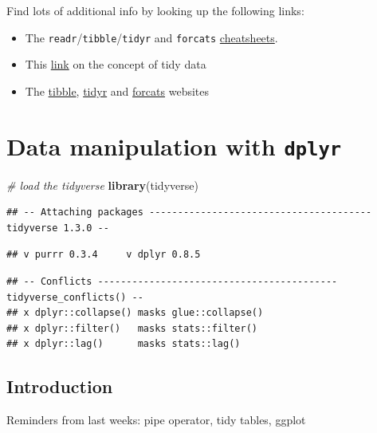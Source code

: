 \documentclass[]{book}
\newenvironment{Shaded}{}{}
\newcommand{\CommentTok}[1]{\textcolor[rgb]{0.38,0.63,0.69}{\textit{#1}}}
\newcommand{\KeywordTok}[1]{\textcolor[rgb]{0.00,0.44,0.13}{\textbf{#1}}}
\newcommand{\NormalTok}[1]{#1}
\providecommand{\tightlist}{%
  \setlength{\itemsep}{0pt}\setlength{\parskip}{0pt}}
\begin{document}
Find lots of additional info by looking up the following links:

\begin{itemize}
\tightlist
\item
  The \texttt{readr}/\texttt{tibble}/\texttt{tidyr} and \texttt{forcats} \href{https://rstudio.com/resources/cheatsheets/}{cheatsheets}.
\item
  This \href{https://tidyr.tidyverse.org/articles/tidy-data.html}{link} on the concept of tidy data
\item
  The \href{https://tibble.tidyverse.org/}{tibble}, \href{https://tidyr.tidyverse.org/}{tidyr} and \href{https://forcats.tidyverse.org/}{forcats} websites
\end{itemize}

\hypertarget{data-manipulation-with-dplyr}{%
\chapter{\texorpdfstring{Data manipulation with \texttt{dplyr}}{Data manipulation with dplyr}}\label{data-manipulation-with-dplyr}}

\begin{Shaded}
\begin{Highlighting}[]
\CommentTok{# load the tidyverse}
\KeywordTok{library}\NormalTok{(tidyverse)}
\end{Highlighting}
\end{Shaded}

\begin{verbatim}
## -- Attaching packages --------------------------------------- tidyverse 1.3.0 --
\end{verbatim}

\begin{verbatim}
## v purrr 0.3.4     v dplyr 0.8.5
\end{verbatim}

\begin{verbatim}
## -- Conflicts ------------------------------------------ tidyverse_conflicts() --
## x dplyr::collapse() masks glue::collapse()
## x dplyr::filter()   masks stats::filter()
## x dplyr::lag()      masks stats::lag()
\end{verbatim}

\hypertarget{introduction}{%
\section{Introduction}\label{introduction}}

Reminders from last weeks: pipe operator, tidy tables, ggplot
\end{document}
